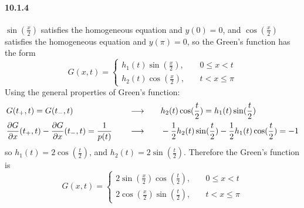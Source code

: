 \documentclass[a4paper]{article}
\begin{document}
\paragraph{10.1.4}
$\sin(\frac{x}{2})$ satisfies the homogeneous equation and $y(0)=0$, and $\cos(\frac{x}{2})$ satisfies the homogeneous equation and $y(\pi)=0$, so the Green's function has the form
\[
G(x,t)=
\begin{cases}
h_1(t)\sin(\frac{x}{2}),\quad & 0\leq x<t\\
h_2(t)\cos(\frac{x}{2}),\quad & t<x\leq\pi
\end{cases}
\]
Using the general properties of Green's function:
\begin{alignat*}{3}
    & G(t_+,t)=G(t_-,t)\quad && \longrightarrow\quad && h_2(t)\cos(\frac{t}{2})=h_1(t)\sin(\frac{t}{2})\\
    & \frac{\partial G}{\partial x}(t_+,t)-\frac{\partial G}{\partial x}(t_-,t)=\frac{1}{p(t)}\quad && \longrightarrow\quad && -\frac{1}{2} h_2(t)\sin(\frac{t}{2})-\frac{1}{2} h_1(t)\cos(\frac{t}{2})=-1
\end{alignat*}
so $h_1(t)=2\cos(\frac{t}{2})$, and $h_2(t)=2\sin(\frac{t}{2})$. Therefore the Green's function is
\[
G(x,t)=
\begin{cases}
2\sin(\frac{x}{2})\cos(\frac{t}{2}),\quad & 0\leq x<t\\[5pt]
2\cos(\frac{x}{2})\sin(\frac{t}{2}),\quad & t<x\leq\pi
\end{cases}
\]
\end{document}

